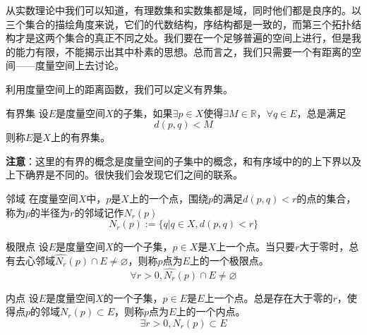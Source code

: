 
\begin{issues}
\issueDraft
\issueTODO
\issueAbstract
\end{issues}



从实数理论中我们可以知道，有理数集和实数集都是域，同时他们都是良序的。以三个集合的描绘角度来说，它们的代数结构，序结构都是一致的，而第三个拓扑结构才是这两个集合的真正不同之处。我们要在一个足够普遍的空间上进行，但是我的能力有限，不能揭示出其中朴素的思想。总而言之，我们只需要一个有距离的空间——度量空间上去讨论。

利用度量空间上的距离函数，我们可以定义有界集。

\begin{definition}{有界集}
设$E$是度量空间$X$的子集，如果$\exists{p}\in{X}$使得$\exists{M}\in{\mathbb{R}}$，$\forall{q}\in{E}$，总是满足
\[d(p,q)<M\]
则称$E$是$X$上的有界集。
\end{definition}

\textbf{注意}：这里的有界的概念是度量空间的子集中的概念，和有序域中的的上下界以及上下确界是不同的。很快我们会发现它们之间的联系。

\begin{definition}{邻域}
在度量空间$X$中，$p$是$X$上的一个点，围绕$p$的满足$d(p,q)<r$的点的集合，称为$p$的半径为$r$的邻域记作$N_r(p)$
\begin{equation}
N_r(p):=\{q|q\in{X},d(p,q)<r\}
\end{equation}
\end{definition}


\begin{definition}{极限点}
设$E$是度量空间$X$的一个子集，$p\in{X}$是$X$上一个点。当只要$r$大于零时，总有{\heiti 去心邻域}$\hat{N_r}(p)\cap{E}\not=\varnothing$，则称$p$点为$E$上的一个{\heiti 极限点}。
\begin{equation}
\forall{r>0},\hat{N_r}(p)\cap{E}\not=\varnothing
\end{equation}
\end{definition}



\begin{definition}{内点}
设$E$是度量空间$X$的一个子集，$p\in{E}$是$E$上一个点。总是存在大于零的$r$，使得点$p$的邻域$N_r(p)\subset{E}$，则称$p$点为$E$上的一个{\heiti 内点}。
\begin{equation}
\exists{r>0},N_r(p)\subset{E}
\end{equation}
\end{definition}

